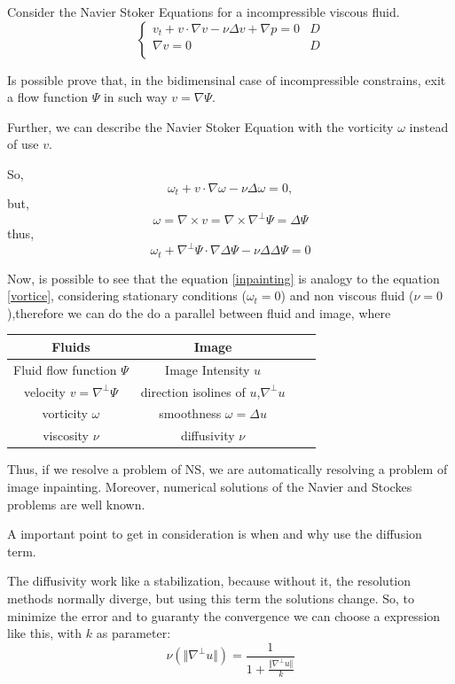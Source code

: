 Consider the Navier Stoker Equations for a incompressible viscous fluid.
\[\begin{cases} v_t+v\cdot\nabla v - \nu\Delta v + \nabla p = 0 & D  \\
		\nabla v  =  0 &  D \\ \end{cases} \]

Is possible prove that, in the bidimensinal case of incompressible constrains, exit a flow function $\Psi$ in such way $v=\nabla\Psi$.

Further, we can describe the Navier Stoker Equation with the vorticity $\omega$ instead of use $v$.

So,
\[\omega_t + v\cdot\nabla\omega - \nu\Delta\omega=0,\]
but,
\[\omega = \nabla\times v = \nabla\times\nabla^\bot\Psi = \Delta\Psi\]
thus,
\begin{equation}\label{vortice}
\omega_t + \nabla^\bot\Psi\cdot\nabla\Delta\Psi - \nu\Delta\Delta\Psi=0
\end{equation}

Now, is possible to see that the equation \eqref{inpainting} is analogy to the equation \eqref{vortice}, considering stationary conditions ($\omega_t=0$) and non viscous fluid ($\nu=0$),therefore we can do the  do a parallel between fluid and image, where

\begin{table}[h]
\centering
\begin{tabular}{c c c c}
\hline\hline
Fluids                             &  Image \\
\hline
Fluid flow function $\Psi$       &  Image Intensity $u$ \\
velocity $v=\nabla^\bot\Psi$       &  direction isolines of $u$,$\nabla^\bot u$ \\
vorticity $\omega$                 &  smoothness $\omega=\Delta u$ \\
viscosity $\nu$                    &  diffusivity $\nu$   \\
\hline
\end{tabular}
\end{table}

Thus, if we resolve a problem of NS, we are automatically resolving a problem of image inpainting. Moreover, numerical solutions of the Navier and Stockes problems are well known.

A important point to get in consideration is when and why use the diffusion term.

The diffusivity work like a stabilization, because without it, the resolution methods normally diverge, but using this term the solutions change. So, to minimize the error and to guaranty the convergence we can choose a expression like this, with $k$ as parameter:
\[\nu(\Vert\nabla^\bot u\Vert)=\frac{1}{1+\frac{\Vert\nabla^\bot u\Vert}{k}}\]


